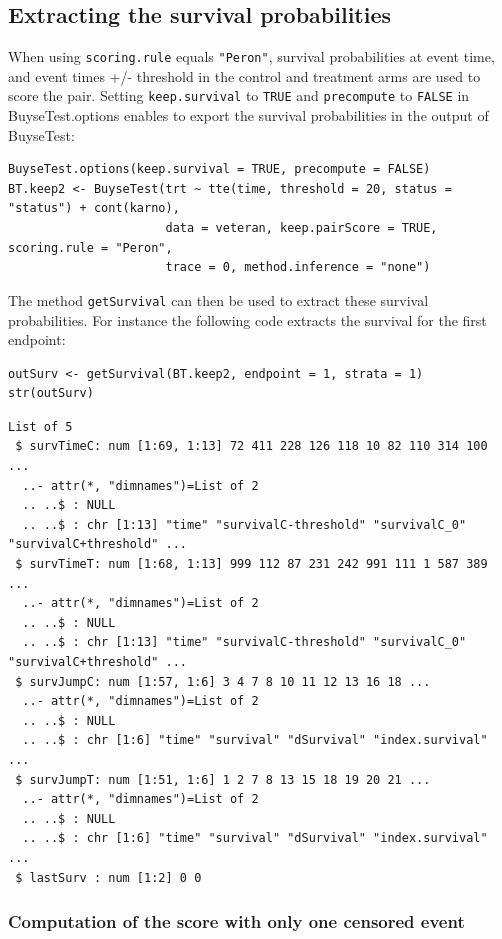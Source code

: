\documentclass[12pt]{article}
\begin{document}
\subsection{Extracting the survival probabilities}
\label{sec:org0060394}
When using \texttt{scoring.rule} equals \texttt{"Peron"}, survival probabilities at
event time, and event times +/- threshold in the control and treatment
arms are used to score the pair. Setting \texttt{keep.survival} to \texttt{TRUE} and
\texttt{precompute} to \texttt{FALSE} in BuyseTest.options enables to export the
survival probabilities in the output of BuyseTest:
\lstset{language=r,label= ,caption= ,captionpos=b,numbers=none}
\begin{lstlisting}
BuyseTest.options(keep.survival = TRUE, precompute = FALSE)
BT.keep2 <- BuyseTest(trt ~ tte(time, threshold = 20, status = "status") + cont(karno),
                      data = veteran, keep.pairScore = TRUE, scoring.rule = "Peron",
                      trace = 0, method.inference = "none")
\end{lstlisting}

The method \texttt{getSurvival} can then be used to extract these survival
probabilities. For instance the following code extracts the survival
for the first endpoint:
\lstset{language=r,label= ,caption= ,captionpos=b,numbers=none}
\begin{lstlisting}
outSurv <- getSurvival(BT.keep2, endpoint = 1, strata = 1)
str(outSurv)
\end{lstlisting}

\begin{verbatim}
List of 5
 $ survTimeC: num [1:69, 1:13] 72 411 228 126 118 10 82 110 314 100 ...
  ..- attr(*, "dimnames")=List of 2
  .. ..$ : NULL
  .. ..$ : chr [1:13] "time" "survivalC-threshold" "survivalC_0" "survivalC+threshold" ...
 $ survTimeT: num [1:68, 1:13] 999 112 87 231 242 991 111 1 587 389 ...
  ..- attr(*, "dimnames")=List of 2
  .. ..$ : NULL
  .. ..$ : chr [1:13] "time" "survivalC-threshold" "survivalC_0" "survivalC+threshold" ...
 $ survJumpC: num [1:57, 1:6] 3 4 7 8 10 11 12 13 16 18 ...
  ..- attr(*, "dimnames")=List of 2
  .. ..$ : NULL
  .. ..$ : chr [1:6] "time" "survival" "dSurvival" "index.survival" ...
 $ survJumpT: num [1:51, 1:6] 1 2 7 8 13 15 18 19 20 21 ...
  ..- attr(*, "dimnames")=List of 2
  .. ..$ : NULL
  .. ..$ : chr [1:6] "time" "survival" "dSurvival" "index.survival" ...
 $ lastSurv : num [1:2] 0 0
\end{verbatim}

\subsubsection{Computation of the score with only one censored event}
\label{sec:org42547d2}
\end{document}
